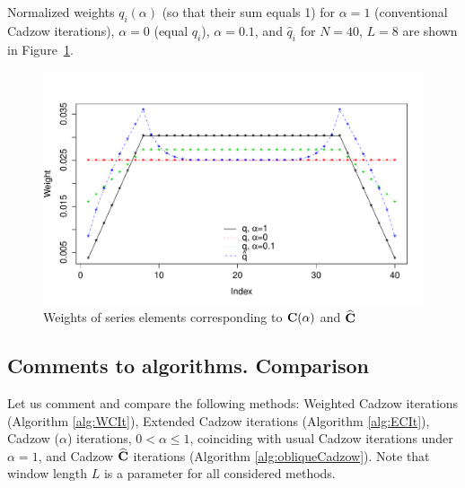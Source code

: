 \documentclass[sii]{ipart}
\begin{document}
Normalized weights $q_i(\alpha)$ (so that their sum equals 1) for $\alpha = 1$ (conventional Cadzow iterations), $\alpha = 0$ (equal $q_i$), $\alpha = 0.1$,
and $\hat{q}_i$ for $N = 40$, $L = 8$ are shown in Figure~\ref{img_weights}.
\begin{figure}
		\includegraphics[width =\columnwidth]{weights.pdf}\caption{Weights of series elements corresponding to $\mathbf{C}(\alpha)$ and $\widehat {\mathbf{C}}$}\label{img_weights}
\end{figure}
	
	\subsection{Comments to algorithms. Comparison}
	
	Let us comment and compare the following methods: Weighted Cadzow iterations (Algorithm \ref{alg:WCIt}), Extended Cadzow iterations (Algorithm \ref{alg:ECIt}), Cadzow ($\alpha$) iterations, $0< \alpha \leq 1$, coinciding with usual Cadzow iterations under $\alpha=1$,
	and Cadzow $\widehat {\mathbf{C}}$ iterations (Algorithm \ref{alg:obliqueCadzow}).
	Note that window length $L$ is a parameter for all considered methods.
	
\end{document}
